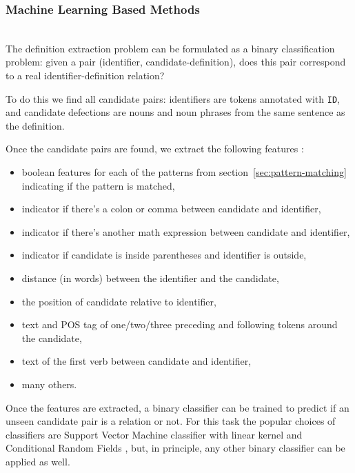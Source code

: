 \subsubsection{Machine Learning Based Methods}

\ \\

The definition extraction problem can be formulated as a binary classification
problem: given a pair (identifier, candidate-definition), does this pair
correspond to a real identifier-definition relation?

To do this we find all candidate pairs: identifiers are tokens
annotated with \texttt{ID}, and candidate defections are nouns and
noun phrases from the same sentence as the definition.

Once the candidate pairs are found, we extract the following features
\cite{yokoi2011contextual} \cite{kristianto2014extracting}:


\begin{itemize}
\itemsep1pt\parskip0pt
  \item boolean features for each of the patterns from
    section~\ref{sec:pattern-matching} indicating if the pattern is matched,
  \item indicator if there's a colon or comma between candidate and identifier,
  \item indicator if there's another math expression between candidate and identifier,
  \item indicator if candidate is inside parentheses and identifier is outside,
  \item distance (in words) between the identifier and the candidate,
  \item the position of candidate relative to identifier,
  \item text and POS tag of one/two/three preceding and following tokens around the candidate,
  \item text of the first verb between candidate and identifier,
  \item many others.
\end{itemize}

Once the features are extracted, a binary classifier can be trained to predict
if an unseen candidate pair is a relation or not.
For this task the popular choices of classifiers are Support Vector Machine
classifier with linear kernel \cite{kristianto2014extracting} \cite{yokoi2011contextual}
and Conditional Random Fields \cite{kristianto2014extracting},
but, in principle, any other binary classifier can be applied
as well.


